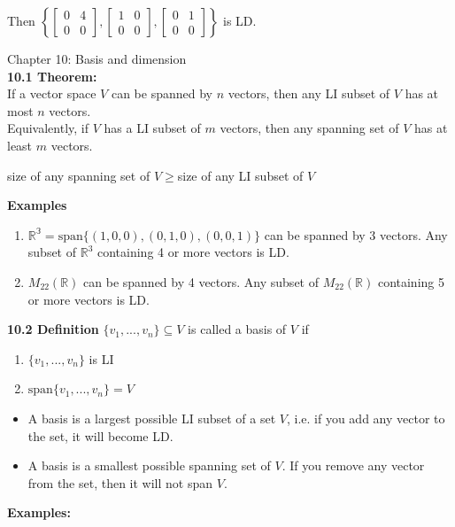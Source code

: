 \documentclass[]{article}
\begin{document}
\begin{enumerate}
			Then $\left\{\begin{bmatrix}{0}&{4}\\{0}&{0}\end{bmatrix},\begin{bmatrix}{1}&{0}\\{0}&{0}\end{bmatrix},\begin{bmatrix}{0}&{1}\\{0}&{0}\end{bmatrix}\right\}$ is LD.
		\end{enumerate}
		\pagebreak
		\Large{Chapter 10: Basis and dimension}\\
		\large{\bf 10.1 Theorem:}\\
		\normalsize If a vector space $V$ can be spanned by $n$ vectors, then any LI subset of $V$ has at most $n$ vectors.\\
		Equivalently, if $V$ has a LI subset of $m$ vectors, then any spanning set of $V$ has at least $m$ vectors.\\
		\begin{center}
			size of any spanning set of $V\ge$size of any LI subset of $V$
		\end{center}
		{\bf Examples}
		\begin{enumerate}
			\item $\mathbb{R^3}=\text{span}\{(1,0,0),(0,1,0),(0,0,1)\}$ can be spanned by 3 vectors. Any subset of $\mathbb{R}^3$ containing 4 or more vectors is LD.
			\item $M_{22}(\mathbb{R})$ can be spanned by 4 vectors. Any subset of $M_{22}(\mathbb{R})$ containing 5 or more vectors is LD.
		\end{enumerate}
		\large{\bf 10.2 Definition}
		\normalsize
		$\{v_1,...,v_n\}\subseteq V$ is called a basis of $V$ if
		\begin{enumerate}
			\item $\{v_1,...,v_n\}$ is LI
			\item $\text{span}\{v_1,...,v_n\}=V$
		\end{enumerate}
		\begin{itemize}
			\item A basis is a largest possible LI subset of a set $V$, i.e. if you add any vector to the set, it will become LD.
			\item A basis is a smallest possible spanning set of $V$. If you remove any vector from the set, then it will not span $V$.
		\end{itemize}
		{\bf Examples:}
\end{document}

